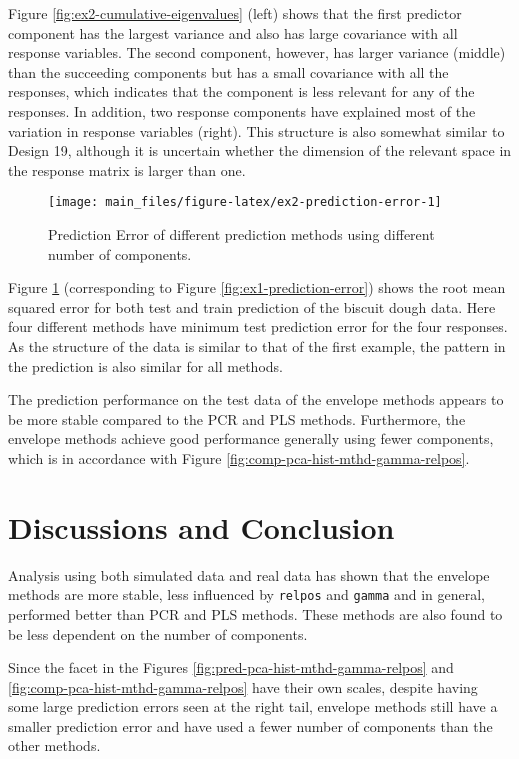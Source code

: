 \documentclass[review]{elsarticle}
\begin{document}
Figure \ref{fig:ex2-cumulative-eigenvalues} (left) shows that the first predictor component has the largest variance and also has large covariance with all response variables. The second component, however, has larger variance (middle) than the succeeding components but has a small covariance with all the responses, which indicates that the component is less relevant for any of the responses. In addition, two response components have explained most of the variation in response variables (right). This structure is also somewhat similar to Design 19, although it is uncertain whether the dimension of the relevant space in the response matrix is larger than one.

\begin{figure}[!htb]
\texttt{[image: main\_files/figure-latex/ex2-prediction-error-1]} \caption{Prediction Error of different prediction methods using different number of components.}\label{fig:ex2-prediction-error}
\end{figure}

Figure \ref{fig:ex2-prediction-error} (corresponding to Figure \ref{fig:ex1-prediction-error}) shows the root mean squared error for both test and train prediction of the biscuit dough data. Here four different methods have minimum test prediction error for the four responses. As the structure of the data is similar to that of the first example, the pattern in the prediction is also similar for all methods.

The prediction performance on the test data of the envelope methods appears to be more stable compared to the PCR and PLS methods. Furthermore, the envelope methods achieve good performance generally using fewer components, which is in accordance with Figure \ref{fig:comp-pca-hist-mthd-gamma-relpos}.

\hypertarget{discussions-and-conclusion}{%
\section{Discussions and Conclusion}\label{discussions-and-conclusion}}

Analysis using both simulated data and real data has shown that the envelope methods are more stable, less influenced by \texttt{relpos} and \texttt{gamma} and in general, performed better than PCR and PLS methods. These methods are also found to be less dependent on the number of components.

Since the facet in the Figures \ref{fig:pred-pca-hist-mthd-gamma-relpos} and \ref{fig:comp-pca-hist-mthd-gamma-relpos} have their own scales, despite having some large prediction errors seen at the right tail, envelope methods still have a smaller prediction error and have used a fewer number of components than the other methods.
\end{document}
